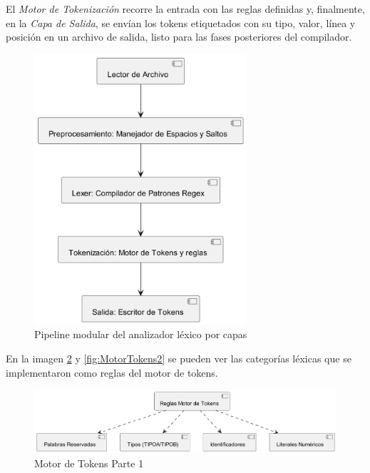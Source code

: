 \documentclass{article}
\begin{document}
El \emph{Motor de Tokenización} recorre la entrada con las reglas definidas y, 
finalmente, en la \emph{Capa de Salida}, se envían los tokens etiquetados 
con su tipo, valor, línea y posición en un archivo de salida, 
listo para las fases posteriores del compilador.

\begin{figure}[ht]
  \centering
  \includegraphics[width=0.7\textwidth]{Flujo.png}
  \caption{Pipeline modular del analizador léxico por capas}
  \label{fig:pipelineLexico}
\end{figure}

\vspace{1em}

En la imagen \ref{fig:MotorTokens1} y \ref{fig:MotorTokens2}
 se pueden ver las categorías léxicas que se implementaron como
reglas del motor de tokens.

\begin{figure}[ht]
  \centering
  \includegraphics[width=1\textwidth]{MotorTokens1.png}
  \caption{Motor de Tokens Parte 1}
  \label{fig:MotorTokens1}
\end{figure}
\end{document}
